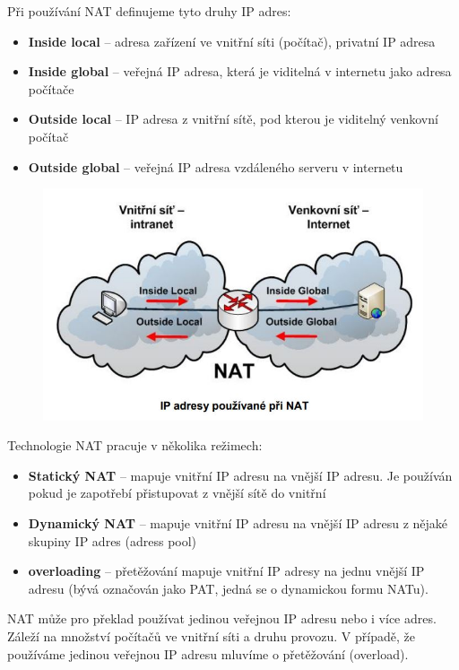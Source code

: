 Při používání NAT definujeme tyto druhy IP adres:
\begin{itemize}
\item \textbf{Inside local} -- adresa zařízení ve vnitřní síti (počítač), privatní IP adresa
\item \textbf{Inside global} -- veřejná IP adresa, která je viditelná v internetu jako adresa počítače
\item \textbf{Outside local} -- IP adresa z vnitřní sítě, pod kterou je viditelný venkovní počítač
\item \textbf{Outside global} -- veřejná IP adresa vzdáleného serveru v internetu
\end{itemize}

\begin{figure}[H]
\centering
\includegraphics[width=1\textwidth]{assets/6_nat_ip}
\end{figure}
Technologie NAT pracuje v několika režimech:
\begin{itemize}
\item \textbf{Statický NAT} -- mapuje vnitřní IP adresu na vnější IP adresu. Je používán pokud je zapotřebí přistupovat z vnější sítě do vnitřní
\item \textbf{Dynamický NAT} -- mapuje vnitřní IP adresu na vnější IP adresu z nějaké skupiny IP adres (adress pool)
\item \textbf{overloading} -- přetěžování mapuje vnitřní IP adresy na jednu vnější IP adresu (bývá označován jako PAT, jedná se o dynamickou formu NATu).
\end{itemize}
NAT může pro překlad používat jedinou veřejnou IP adresu nebo i více adres. Záleží na množství počítačů ve vnitřní síti a druhu provozu. V případě, že používáme jedinou veřejnou IP adresu mluvíme o přetěžování (overload). 

